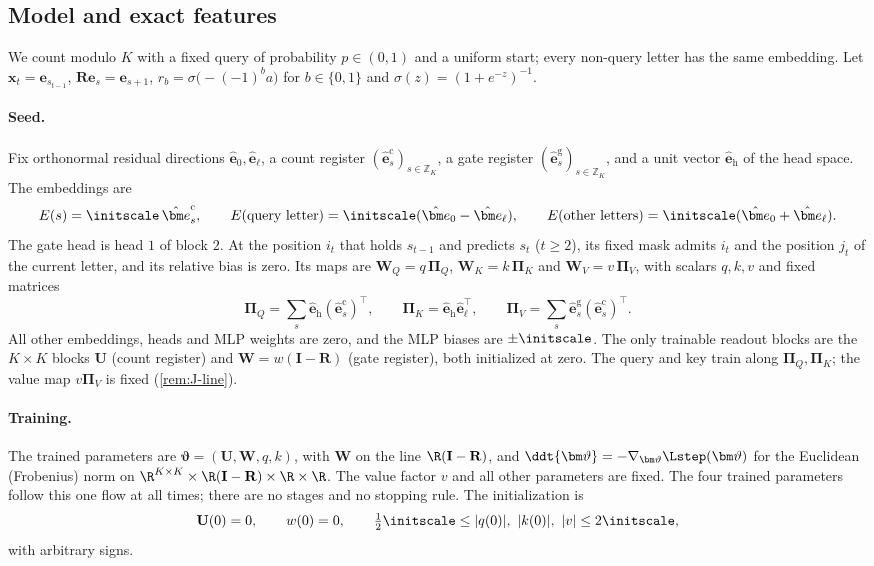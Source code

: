 \subsection{Model and exact features}

We count modulo $K$ with a fixed query of probability $p\in(0,1)$ and a uniform start; every non-query letter has the same embedding. Let $\bm x_t=\bm e_{s_{t-1}}$, $\mathbf R\bm e_s=\bm e_{s+1}$, $r_b=\sigma\bigl(-(-1)^ba\bigr)$ for $b\in\{0,1\}$ and $\sigma(z)=(1+e^{-z})^{-1}$.

\paragraph{Seed.} Fix orthonormal residual directions $\hat{\bm e}_0,\hat{\bm e}_\ell$, a count register $(\hat{\bm e}^{\mathrm c}_s)_{s\in\mathbb Z_K}$, a gate register
$(\hat{\bm e}^{\mathrm g}_s)_{s\in\mathbb Z_K}$, and a unit vector $\hat{\bm e}_{\mathrm h}$ of the head space. The embeddings are
\[
 E(s)=\initscale\,\hat{\bm e}^{\mathrm c}_s,\qquad E(\text{query letter})=\initscale(\hat{\bm e}_0-\hat{\bm e}_\ell),\qquad E(\text{other letters})=\initscale(\hat{\bm e}_0+\hat{\bm e}_\ell).
\]
The gate head is head $1$ of block $2$. At the position $i_t$ that holds $s_{t-1}$ and predicts $s_t$ ($t\ge2$), its fixed mask admits
$i_t$ and the position $j_t$ of the current letter, and its relative bias is zero. Its maps are $\mathbf W_Q=q\,\bm\Pi_Q$, $\mathbf W_K=k\,\bm\Pi_K$ and
$\mathbf W_V=v\,\bm\Pi_V$, with scalars $q,k,v$ and fixed matrices
\[
 \bm\Pi_Q=\textstyle\sum_s\hat{\bm e}_{\mathrm h}(\hat{\bm e}^{\mathrm c}_s)^{\!\top},\qquad \bm\Pi_K=\hat{\bm e}_{\mathrm h}\hat{\bm e}_\ell^{\top},\qquad \bm\Pi_V=\sum_s\hat{\bm e}^{\mathrm g}_s(\hat{\bm e}^{\mathrm c}_s)^{\!\top}.
\]
All other embeddings, heads and MLP weights are zero, and the MLP biases are $\pm\initscale$. The only trainable readout blocks are the
$K\times K$ blocks $\mathbf U$ (count register) and $\mathbf W=w(\mathbf I-\mathbf R)$ (gate register), both initialized at zero.
The query and key train along $\bm\Pi_Q,\bm\Pi_K$; the value map $v\bm\Pi_V$ is fixed (\cref{rem:J-line}).

\paragraph{Training.} The trained parameters are $\bm\vartheta=(\mathbf U,\mathbf W,q,k)$, with $\mathbf W$ on the line $\R(\mathbf I-\mathbf R)$, and
$\ddt{\bm\vartheta}=-\nabla_{\bm\vartheta}\Lstep(\bm\vartheta)$ for the Euclidean (Frobenius) norm on $\R^{K\times K}\times\R(\mathbf I-\mathbf R)\times\R\times\R$. The value factor $v$
and all other parameters are fixed. The four trained parameters follow this one flow at all times; there are no stages and no stopping
rule. The initialization is
\[
 \mathbf U(0)=0,\qquad w(0)=0,\qquad \tfrac{1}{2}\initscale\le|q(0)|,\ |k(0)|,\ |v|\le2\initscale,
\]
with arbitrary signs.


